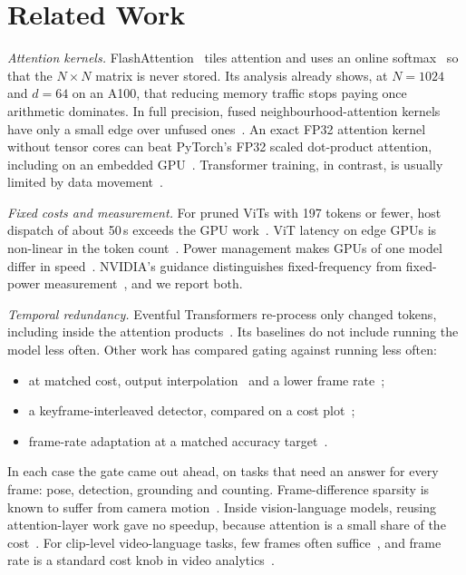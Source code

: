 \documentclass[conference]{IEEEtran}
\newcommand{\NxN}{$N\times N$}
\begin{document}
\section{Related Work}
\textit{Attention kernels.} FlashAttention~\cite{dao2022flashattention,dao2024flashattention2} tiles attention and
uses an online softmax~\cite{milakov2018online} so that the \NxN{} matrix is never stored. Its analysis already
shows, at $N = 1024$ and $d = 64$ on an A100, that reducing memory traffic stops paying once arithmetic
dominates. In full precision, fused neighbourhood-attention kernels have only a small edge over unfused
ones~\cite{hassani2024faster}. An exact FP32 attention kernel without tensor cores can beat PyTorch's FP32 scaled
dot-product attention, including on an embedded GPU~\cite{hsu2026elsa}. Transformer training, in contrast, is
usually limited by data movement~\cite{ivanov2021data,liu2023efficientvit}.

\textit{Fixed costs and measurement.} For pruned ViTs with 197 tokens or fewer, host dispatch of about 50\,\textmu s
exceeds the GPU work~\cite{abdellatif2026dispatch}. ViT latency on edge GPUs is non-linear in the token
count~\cite{eliopoulos2025pruning}. Power management makes GPUs of one model differ in
speed~\cite{sinha2022notall}. NVIDIA's guidance distinguishes fixed-frequency from fixed-power
measurement~\cite{nvidiacutlassmethodology}, and we report both.

\textit{Temporal redundancy.} Eventful Transformers re-process only changed tokens, including inside the attention
products~\cite{dutson2023eventful}. Its baselines do not include running the model less often. Other work has
compared gating against running less often:
\begin{itemize}
\item at matched cost, output interpolation~\cite{dutson2022evnets} and a lower frame
rate~\cite{soldan2025residualvit};
\item a keyframe-interleaved detector, compared on a cost plot~\cite{habibian2021skip};
\item frame-rate adaptation at a matched accuracy target~\cite{li2020reducto}.
\end{itemize}
In each case the gate came out ahead, on tasks that need an answer for every frame: pose, detection, grounding
and counting. Frame-difference sparsity is known to suffer from camera
motion~\cite{parger2022deltacnn,parger2023motiondeltacnn,choudhury2024rlt}. Inside vision-language models,
reusing attention-layer work gave no speedup, because attention is a small share of the
cost~\cite{hwang2025dejavu}. For clip-level video-language tasks, few frames often
suffice~\cite{zohar2025apollo,lei2023singularity,buch2022atp}, and frame rate is a standard cost knob in video
analytics~\cite{jiang2018chameleon,kang2017noscope}.
\end{document}
